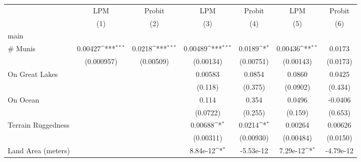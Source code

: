{
\def\sym#1{\ifmmode^{#1}\else\(^{#1}\)\fi}
\begin{tabular}{l*{6}{c}}
\toprule
                    &\multicolumn{1}{c}{LPM}&\multicolumn{1}{c}{Probit}&\multicolumn{1}{c}{LPM}&\multicolumn{1}{c}{Probit}&\multicolumn{1}{c}{LPM}&\multicolumn{1}{c}{Probit}\\
                    &\multicolumn{1}{c}{(1)}         &\multicolumn{1}{c}{(2)}         &\multicolumn{1}{c}{(3)}         &\multicolumn{1}{c}{(4)}         &\multicolumn{1}{c}{(5)}         &\multicolumn{1}{c}{(6)}         \\
\midrule
main                &                     &                     &                     &                     &                     &                     \\
\# Munis            &     0.00427\sym{***}&      0.0218\sym{***}&     0.00489\sym{***}&      0.0189\sym{*}  &     0.00436\sym{**} &      0.0173         \\
                    &  (0.000957)         &   (0.00509)         &   (0.00134)         &   (0.00751)         &   (0.00143)         &    (0.0173)         \\
\addlinespace
On Great Lakes      &                     &                     &     0.00583         &      0.0854         &      0.0860         &      0.0425         \\
                    &                     &                     &     (0.118)         &     (0.375)         &    (0.0902)         &     (0.434)         \\
\addlinespace
On Ocean            &                     &                     &       0.114         &       0.354         &      0.0496         &     -0.0406         \\
                    &                     &                     &    (0.0722)         &     (0.255)         &     (0.159)         &     (0.653)         \\
\addlinespace
Terrain Ruggedness  &                     &                     &     0.00688\sym{*}  &      0.0214\sym{*}  &     0.00264         &     0.00626         \\
                    &                     &                     &   (0.00311)         &   (0.00930)         &   (0.00484)         &    (0.0150)         \\
\addlinespace
Land Area (meters)  &                     &                     &    8.84e-12\sym{*}  &   -5.53e-12         &    7.29e-12\sym{*}  &   -4.79e-12         \\

\end{tabular}}
